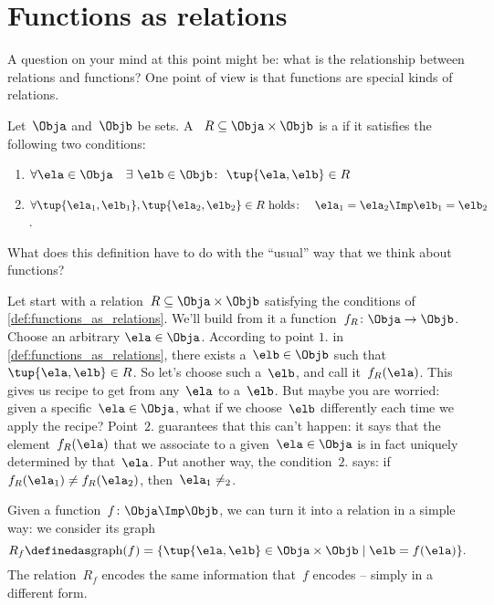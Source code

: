 

\section{Functions as relations}

A question on your mind at this point might be: what is the relationship between relations and functions? One point of view is that functions are special kinds of relations.

\begin{definition}
  \label{def:functions_as_relations}
  Let~$\Obja$ and~$\Objb$ be sets. A ~$R \subseteq \Obja \times \Objb$ is a \textbf{} if it satisfies the following two conditions:
  \begin{enumerate}
    \item $\forall \ela \in \Obja \quad \exists \ \elb \in \Objb\colon  \ \tup{\ela,\elb} \in R$
    \item $\forall \tup{\ela_1, \elb_1}, \tup{\ela_2, \elb_2} \in R  \text{ holds}\colon \quad \ela_1 = \ela_2 \Imp \elb_1 = \elb_2$.
  \end{enumerate}
\end{definition}

What does this definition have to do with the ``usual'' way that we think about functions?

Let start with a relation~$R \subseteq \Obja \times \Objb$ satisfying the conditions of \cref{def:functions_as_relations}. We'll build from it a function~$f_R \colon \Obja \to \Objb$. Choose an arbitrary $\ela \in \Obja$. According to point $1.$ in \cref{def:functions_as_relations}, there exists a~$\elb \in \Objb$ such that~$\tup{\ela,\elb} \in R$. So let's choose such a~$\elb$, and call it~$f_R(\ela)$. This gives us recipe to get from any~$\ela$ to a~$\elb$. But maybe you are worried: given a specific~$\ela \in \Obja$, what if we choose~$\elb$ differently each time we apply the recipe? Point~$2.$ guarantees that this can't happen: it says that the element~$f_R(\ela)$ that we associate to a given~$\ela \in \Obja$ is in fact uniquely determined by that~$\ela$. Put another way, the condition~$2.$ says: if~$f_R(\ela_1) \neq f_R(\ela_2)$, then~$\ela_1 \neq _2$.

Given a function~$f \colon \Obja \Imp \Objb$, we can turn it into a relation in a simple way: we consider its graph
\begin{equation*}
  R_f \definedas \text{graph}(f) = \{ \tup{\ela,\elb} \in \Obja \times \Objb \mid \elb= f(\ela) \}.
\end{equation*}
The relation~$R_f$ encodes the same information that~$f$ encodes -- simply in a different form.

